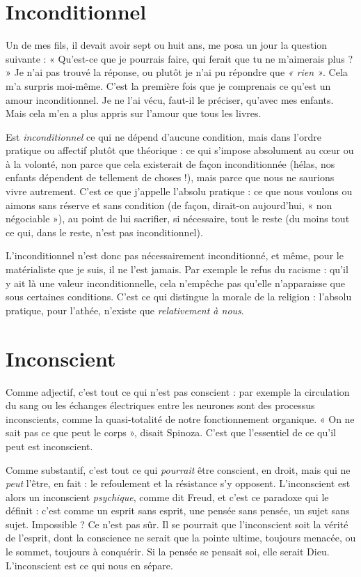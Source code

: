 \section{Inconditionnel}
Un de mes fils, il devait avoir sept ou huit ans, me
posa un jour la question suivante : « Qu'est-ce que je
pourrais faire, qui ferait que tu ne m'aimerais plus ? » Je n’ai pas trouvé la
réponse, ou plutôt je n’ai pu répondre que {\it « rien »}. Cela m’a surpris moi-même.
C’est la première fois que je comprenais ce qu’est un amour inconditionnel.
Je ne l'ai vécu, faut-il le préciser, qu'avec mes enfants. Mais cela m’en
a plus appris sur l’amour que tous les livres.

Est {\it inconditionnel} ce qui ne dépend d’aucune condition, mais dans l’ordre
pratique ou affectif plutôt que théorique : ce qui s'impose absolument au cœur
ou à la volonté, non parce que cela existerait de façon inconditionnée (hélas,
nos enfants dépendent de tellement de choses !), mais parce que nous ne saurions
vivre autrement. C’est ce que j'appelle l’absolu pratique : ce que nous
voulons ou aimons sans réserve et sans condition (de façon, dirait-on
aujourd’hui, « non négociable »), au point de lui sacrifier, si nécessaire, tout le
reste (du moins tout ce qui, dans le reste, n’est pas inconditionnel).

L’inconditionnel n’est donc pas nécessairement inconditionné, et même,
pour le matérialiste que je suis, il ne l’est jamais. Par exemple le refus du
racisme : qu'il y ait là une valeur inconditionnelle, cela n'empêche pas qu’elle
n’apparaisse que sous certaines conditions. C’est ce qui distingue la morale de
la religion : l’absolu pratique, pour l’athée, n'existe que {\it relativement à nous}.

\section{Inconscient}
Comme adjectif, c’est tout ce qui n’est pas conscient : par
exemple la circulation du sang ou les échanges électriques
entre les neurones sont des processus inconscients, comme la quasi-totalité de
notre fonctionnement organique. « On ne sait pas ce que peut le corps », disait
Spinoza. C’est que l’essentiel de ce qu’il peut est inconscient.

Comme substantif, c’est tout ce qui {\it pourrait} être conscient, en droit, mais
qui ne {\it peut} l'être, en fait : le refoulement et la résistance s’y opposent. L’inconscient
est alors un inconscient {\it psychique}, comme dit Freud, et c’est ce paradoxe
qui le définit : c’est comme un esprit sans esprit, une pensée sans pensée, un
sujet sans sujet. Impossible ? Ce n’est pas sûr. Il se pourrait que l’inconscient
soit la vérité de l'esprit, dont la conscience ne serait que la pointe ultime, toujours
menacée, ou le sommet, toujours à conquérir. Si la pensée se pensait soi,
elle serait Dieu. L’inconscient est ce qui nous en sépare.

